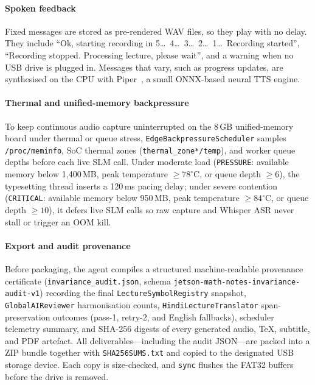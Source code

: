 \documentclass[11pt,a4paper,oneside]{report}
\theoremstyle{definition}
\newcommand{\code}[1]{\texttt{\small #1}}
\begin{document}
\paragraph{Spoken feedback} Fixed messages are stored as pre-rendered WAV files, so they play with no delay. They include ``Ok, starting recording in 5\ldots\ 4\ldots\ 3\ldots\ 2\ldots\ 1\ldots\ Recording started'', ``Recording stopped. Processing lecture, please wait'', and a warning when no USB drive is plugged in. Messages that vary, such as progress updates, are synthesised on the CPU with Piper~\cite{piper}, a small ONNX-based neural TTS engine.

\paragraph{Thermal and unified-memory backpressure} To keep continuous audio capture uninterrupted on the 8\,GB unified-memory board under thermal or queue stress, \code{EdgeBackpressureScheduler} samples \code{/proc/meminfo}, SoC thermal zones (\code{thermal\_zone*/temp}), and worker queue depths before each live SLM call. Under moderate load (\code{PRESSURE}: available memory below 1{,}400\,MB, peak temperature $\ge 78^\circ$C, or queue depth $\ge 6$), the typesetting thread inserts a 120\,ms pacing delay; under severe contention (\code{CRITICAL}: available memory below 950\,MB, peak temperature $\ge 84^\circ$C, or queue depth $\ge 10$), it defers live SLM calls so raw capture and Whisper ASR never stall or trigger an OOM kill.

\paragraph{Export and audit provenance} Before packaging, the agent compiles a structured machine-readable provenance certificate (\code{invariance\_audit.json}, schema \code{jetson-math-notes-invariance-audit-v1}) recording the final \code{LectureSymbolRegistry} snapshot, \code{GlobalAIReviewer} harmonisation counts, \code{HindiLectureTranslator} span-preservation outcomes (pass-1, retry-2, and English fallbacks), scheduler telemetry summary, and SHA-256 digests of every generated audio, TeX, subtitle, and PDF artefact. All deliverables---including the audit JSON---are packed into a ZIP bundle together with \code{SHA256SUMS.txt} and copied to the designated USB storage device. Each copy is size-checked, and \code{sync} flushes the FAT32 buffers before the drive is removed.

\end{document}
